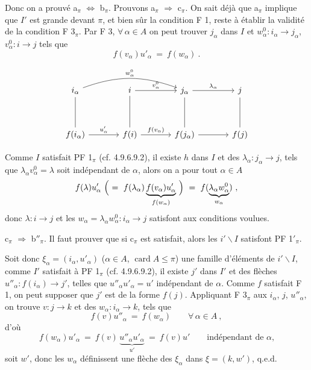 \documentclass[11pt]{article}
\newcommand{\printedpage}[1]{\marginpar{\footnotesize p.~#1}}
\newcommand{\msp}[1]{\marginpar{\footnotesize [#1]}}
\newcommand{\card}{\operatorname{card}}
\begin{document}
Donc on a prouvé a$_\pi$ $\Longleftrightarrow$ b$_\pi$. Prouvons a$_\pi$ $\Longrightarrow$ c$_\pi$. On sait déjà que a$_\pi$ implique que $I'$ est grande devant $\pi$, et bien sûr la condition F 1, reste à établir la validité de la condition F 3$_\pi$. Par F 3, $\forall\, \alpha \in A$ on peut trouver $j_\alpha$ dans $I$ et $w^0_\alpha : i_\alpha \longrightarrow j_\alpha$, $v^0_\alpha : i \longrightarrow j$ tels que %
\[
f(v_\alpha)u'_\alpha \ = \ f(w_\alpha) \ .
\]

\printedpage{90}

\[
\begin{tikzcd}[column sep=large, row sep=huge]
i_\alpha \arrow[rr, bend left=20, "w^0_\alpha"] \arrow[d, dash] & i \arrow[r, "v^0_\alpha"] \arrow[d, dash] & j_\alpha \arrow[r, "\lambda_\alpha"] \arrow[d, dash] & j \arrow[d, dash] \\
f(i_\alpha) \arrow[r, "u'_\alpha"] & f(i) \arrow[r, "f(v_\alpha)"] & f(j_\alpha) \arrow[r] & f(j)
\end{tikzcd}
\]

Comme $I$ satisfait PF 1$_\pi$ (cf. 4.9.6.9.2), il existe $h$ dans $I$ et des $\lambda_\alpha : j_\alpha \longrightarrow j$, tels que $\lambda_\alpha v^0_\alpha = \lambda$ soit indépendant de $\alpha$, alors on a pour tout $\alpha \in A$ %
\[
f(\lambda)u'_\alpha \ \Bigl( \ = \ f(\lambda_\alpha)\underbrace{f(v_\alpha)u'_\alpha}_{f(w_\alpha)} \ \Bigr) \ = \ f(\underbrace{\lambda_\alpha w^0_\alpha}_{w_\alpha}) \ ,
\]
donc $\lambda : i \longrightarrow j$ et les $w_\alpha = \lambda_\alpha w^0_\alpha : i_\alpha \longrightarrow j$ satisfont aux conditions voulues.

c$_\pi$ $\Longrightarrow$ b$''_\pi$. Il faut prouver que si c$_\pi$ est satisfait, alors les $i'\backslash I$ satisfont PF 1$'_\pi$.

\msp{page 241}
Soit donc $\xi_\alpha = (i_\alpha, u'_\alpha)$ ($\alpha \in A$, $\card A \leqslant \pi$) une famille d'éléments de $i'\backslash I$, comme $I'$ satisfait à PF 1$_\pi$ (cf. 4.9.6.9.2), il existe $j'$ dans $I'$ et des flèches $u''_\alpha : f(i_\alpha) \longrightarrow j'$, telles que $u''_\alpha u'_\alpha = u'$ indépendant de $\alpha$. Comme $f$ satisfait F 1, on peut supposer que $j'$ est de la forme $f(j)$. Appliquant F 3$_\pi$ aux $i_\alpha$, $j$, $u''_\alpha$, on trouve $v : j \longrightarrow k$ et des $w_\alpha : i_\alpha \longrightarrow k$, tels que
\[
f(v)u''_\alpha \ = \ f(w_\alpha) \qquad \forall\, \alpha \in A \ ,
\]
d'où
\[
f(w_\alpha)u'_\alpha \ = \ f(v)\,\underbrace{u''_\alpha u'_\alpha}_{u'} \ = \ f(v)u' \qquad \text{indépendant de $\alpha$,}
\]
soit $w'$, donc les $w_\alpha$ définissent une flèche des $\xi_\alpha$ dans $\xi = (k, w')$, q.e.d.
\end{document}
